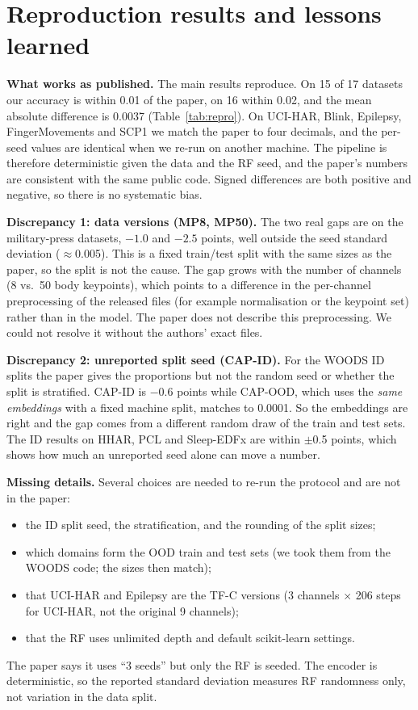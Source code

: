 \documentclass[conference]{IEEEtran}
\begin{document}
\section{Reproduction results and lessons learned}\label{sec:lessons}

\textbf{What works as published.} The main results reproduce. On 15 of 17 datasets our accuracy is within 0.01 of
the paper, on 16 within 0.02, and the mean absolute difference is 0.0037 (Table~\ref{tab:repro}). On UCI-HAR, Blink,
Epilepsy, FingerMovements and SCP1 we match the paper to four decimals, and the per-seed values are identical when
we re-run on another machine. The pipeline is therefore deterministic given the data and the RF seed, and the paper's
numbers are consistent with the same public code. Signed differences are both positive and negative, so there is no
systematic bias.

\textbf{Discrepancy 1: data versions (MP8, MP50).} The two real gaps are on the military-press datasets, $-1.0$ and
$-2.5$ points, well outside the seed standard deviation ($\approx$0.005). This is a fixed train/test split with the same sizes as
the paper, so the split is not the cause. The gap grows with the number of channels (8 vs.\ 50 body keypoints), which points to a difference in the
per-channel preprocessing of the released files (for example normalisation or the keypoint set) rather than in the
model. The paper does not describe this preprocessing. We could not resolve it without the authors' exact files.

\textbf{Discrepancy 2: unreported split seed (CAP-ID).} For the WOODS ID splits the paper gives the proportions but not
the random seed or whether the split is stratified. CAP-ID is $-0.6$ points while CAP-OOD, which uses the
\emph{same embeddings} with a fixed machine split, matches to 0.0001. So the embeddings are right and the gap comes
from a different random draw of the train and test sets. The ID results on HHAR, PCL and Sleep-EDFx are within
$\pm$0.5 points, which shows how much an unreported seed alone can move a number.

\textbf{Missing details.} Several choices are needed to re-run the protocol and are not in the paper:
\begin{itemize}
\item the ID split seed, the stratification, and the rounding of the split sizes;
\item which domains form the OOD train and test sets (we took them from the WOODS code; the sizes then match);
\item that UCI-HAR and Epilepsy are the TF-C versions (3 channels $\times$ 206 steps for UCI-HAR, not the original
9 channels);
\item that the RF uses unlimited depth and default scikit-learn settings.
\end{itemize}
The paper says it uses ``3 seeds'' but only the RF is seeded. The encoder is deterministic, so the reported standard
deviation measures RF randomness only, not variation in the data split.
\end{document}
